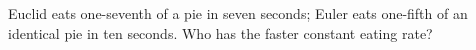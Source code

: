 Euclid eats one-seventh of a pie in seven seconds; Euler eats one-fifth of an identical pie in ten seconds. Who has the faster constant eating rate?
